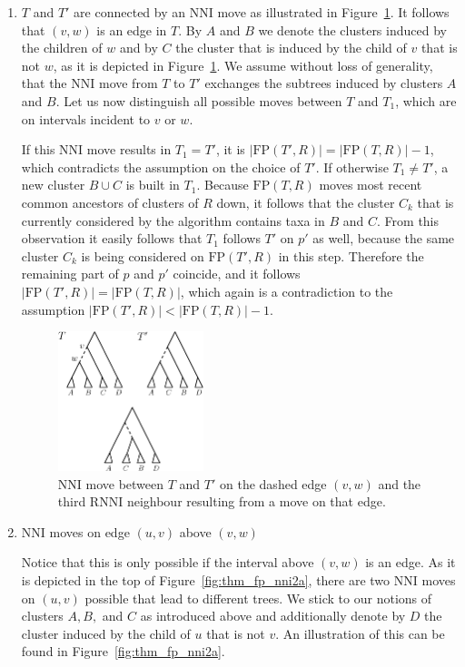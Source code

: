 \documentclass{amsart}
\newcommand{\rnni}{\mathrm{RNNI}}
\newcommand{\nni}{\mathrm{NNI}}
\newcommand{\fp}{\mathrm{FP}}
\begin{document}
\begin{enumerate}[{Case} (1).]
\item $T$ and $T'$ are connected by an $\nni$ move as illustrated in Figure~\ref{fig:thm_fp_nni1}.
It follows that $(v,w)$ is an edge in $T$.
By $A$ and $B$ we denote the clusters induced by the children of $w$ and by $C$ the cluster that is induced by the child of $v$ that is not $w$, as it is depicted in Figure~\ref{fig:thm_fp_nni1}.
We assume without loss of generality, that the $\nni$ move from $T$ to $T'$ exchanges the subtrees induced by clusters $A$ and $B$.
Let us now distinguish all possible moves between $T$ and $T_1$, which are on intervals incident to $v$ or $w$.


If this $\nni$ move results in $T_1 = T'$, it is $|\fp(T',R)| = |\fp(T,R)| - 1$, which contradicts the assumption on the choice of $T'$.
If otherwise $T_1 \neq T'$, a new cluster $B \cup C$ is built in $T_1$.
Because $\fp(T,R)$ moves most recent common ancestors of clusters of $R$ down, it follows that the cluster $C_k$ that is currently considered by the algorithm contains taxa in $B$ and $C$.
From this observation it easily follows that $T_1$ follows $T'$ on $p'$ as well, because the same cluster $C_k$ is being considered on $\fp(T',R)$ in this step.
Therefore the remaining part of $p$ and $p'$ coincide, and it follows $|\fp(T',R)| = |\fp(T,R)|$, which again is a contradiction to the assumption $|\fp(T',R)| < |\fp(T,R)| - 1$.

\begin{figure}[!hbt]
\centering
\includegraphics[width=0.4\textwidth]{thm_fp_nni1}
\vspace{12pt}
\caption{$\nni$ move between $T$ and $T'$ on the dashed edge $(v,w)$ and the third $\rnni$ neighbour resulting from a move on that edge.}
\label{fig:thm_fp_nni1}
\end{figure}

\item $\nni$ moves on edge $(u,v)$ above $(v,w)$

Notice that this is only possible if the interval above $(v,w)$ is an edge.
As it is depicted in the top of Figure~\ref{fig:thm_fp_nni2a}, there are two $\nni$ moves on $(u,v)$ possible that lead to different trees.
We stick to our notions of clusters $A,B,$ and $C$ as introduced above and additionally denote by $D$ the cluster induced by the child of $u$ that is not $v$.
An illustration of this can be found in Figure~\ref{fig:thm_fp_nni2a}.


\end{enumerate}
\end{document}

